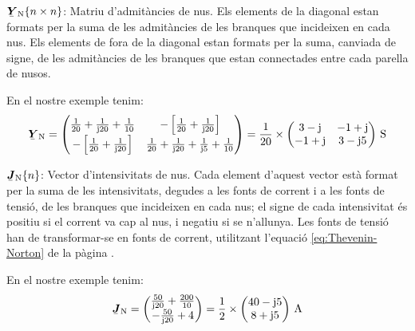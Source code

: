 \begin{list}{}
   {\setlength{\labelwidth}{20mm} \setlength{\leftmargin}{22mm} \setlength{\labelsep}{2mm}}

   \item[$\mcmplx{Y}\ped{N}\{n \times n\}$:] Matriu d'admit\`{a}ncies de nus. Els elements de la diagonal estan formats per la suma de les admit\`{a}ncies de les branques que incideixen en cada nus.
   Els elements de fora de la diagonal estan formats per la suma, canviada de signe, de les admit\`{a}ncies de les branques que estan connectades entre cada parella de nusos.

   En el nostre exemple tenim:
   \[
      \mcmplx{Y}\ped{N} =
      \begin{pmatrix}
            \frac{1}{20} + \frac{1}{\ju 20} +  \frac{1}{10} &
            -\left[\frac{1}{20} + \frac{1}{\ju 20}\right] \\
            -\left[\frac{1}{20} + \frac{1}{\ju 20}\right]  &
            \frac{1}{20} + \frac{1}{\ju 20} +  \frac{1}{\ju 5} + \frac{1}{10}
      \end{pmatrix} =
      \frac{1}{20} \times \begin{pmatrix}
            3 - \ju  & -1 + \ju \\ -1 + \ju & 3 - \ju 5
      \end{pmatrix}\unit{S}
   \]

   \item[$\mcmplx{J}\ped{N}\{n\}$:] Vector
d'intensivitats de nus. Cada element d'aquest vector est\`{a} format per la suma de
les intensivitats, degudes a les fonts de corrent i a les fonts de tensi\'{o}, de les
branques que incideixen en cada nus; el signe de cada intensivitat \'{e}s positiu si el
corrent va cap al nus, i negatiu si se n'allunya. Les fonts de tensi\'{o} han de
transformar-se en fonts de corrent, utilitzant l'equaci\'{o} \eqref{eq:Thevenin-Norton} de
la p\`{a}gina \pageref{eq:Thevenin-Norton}.

   En el nostre exemple tenim:
   \[
      \mcmplx{J}\ped{N} =
      \begin{pmatrix}
            \frac{50}{\ju 20} +  \frac{200}{10} \\
            - \frac{50}{\ju 20} + 4
      \end{pmatrix} =
      \frac{1}{2} \times \begin{pmatrix}
            40 - \ju 5 \\
            8 + \ju 5
      \end{pmatrix}\unit{A}
   \]

\end{list}

